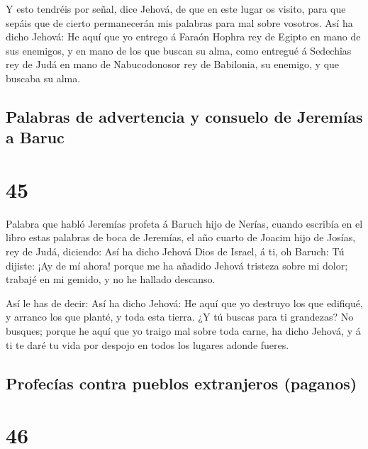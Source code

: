  Y esto tendréis por señal, dice Jehová, de que en este
lugar os visito, para que sepáis que de cierto permanecerán mis palabras
para mal sobre vosotros.  Así ha dicho Jehová: He aquí
que yo entrego á Faraón Hophra rey de Egipto en mano de sus enemigos, y
en mano de los que buscan su alma, como entregué á Sedechîas rey de Judá
en mano de Nabucodonosor rey de Babilonia, su enemigo, y que buscaba su
alma.

\hypertarget{palabras-de-advertencia-y-consuelo-de-jeremuxedas-a-baruc}{%
\subsection{Palabras de advertencia y consuelo de Jeremías a
Baruc}\label{palabras-de-advertencia-y-consuelo-de-jeremuxedas-a-baruc}}

\hypertarget{section-44}{%
\section{45}\label{section-44}}

 Palabra que habló Jeremías profeta á Baruch hijo de
Nerías, cuando escribía en el libro estas palabras de boca de Jeremías,
el año cuarto de Joacim hijo de Josías, rey de Judá, diciendo:
 Así ha dicho Jehová Dios de Israel, á ti, oh Baruch:
 Tú dijiste: ¡Ay de mí ahora! porque me ha añadido Jehová
tristeza sobre mi dolor; trabajé en mi gemido, y no he hallado descanso.

 Así le has de decir: Así ha dicho Jehová: He aquí que yo
destruyo los que edifiqué, y arranco los que planté, y toda esta tierra.
 ¿Y tú buscas para ti grandezas? No busques; porque he
aquí que yo traigo mal sobre toda carne, ha dicho Jehová, y á ti te daré
tu vida por despojo en todos los lugares adonde fueres.

\hypertarget{profecuxedas-contra-pueblos-extranjeros-paganos}{%
\subsection{Profecías contra pueblos extranjeros
(paganos)}\label{profecuxedas-contra-pueblos-extranjeros-paganos}}

\hypertarget{section-45}{%
\section{46}\label{section-45}}


